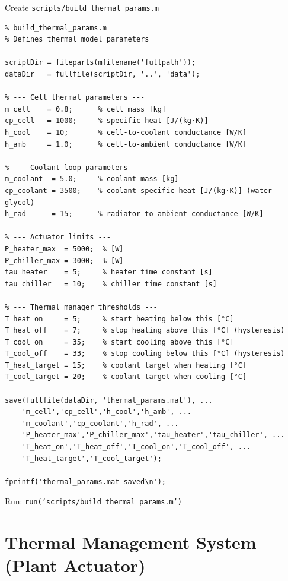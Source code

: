 \documentclass[11pt,a4paper]{article}
\begin{document}
\begin{scriptbox}{Create \texttt{scripts/build\_thermal\_params.m}}
\begin{verbatim}
% build_thermal_params.m
% Defines thermal model parameters

scriptDir = fileparts(mfilename('fullpath'));
dataDir   = fullfile(scriptDir, '..', 'data');

% --- Cell thermal parameters ---
m_cell    = 0.8;      % cell mass [kg]
cp_cell   = 1000;     % specific heat [J/(kg·K)]
h_cool    = 10;       % cell-to-coolant conductance [W/K]
h_amb     = 1.0;      % cell-to-ambient conductance [W/K]

% --- Coolant loop parameters ---
m_coolant  = 5.0;     % coolant mass [kg]
cp_coolant = 3500;    % coolant specific heat [J/(kg·K)] (water-glycol)
h_rad      = 15;      % radiator-to-ambient conductance [W/K]

% --- Actuator limits ---
P_heater_max  = 5000;  % [W]
P_chiller_max = 3000;  % [W]
tau_heater    = 5;     % heater time constant [s]
tau_chiller   = 10;    % chiller time constant [s]

% --- Thermal manager thresholds ---
T_heat_on     = 5;     % start heating below this [°C]
T_heat_off    = 7;     % stop heating above this [°C] (hysteresis)
T_cool_on     = 35;    % start cooling above this [°C]
T_cool_off    = 33;    % stop cooling below this [°C] (hysteresis)
T_heat_target = 15;    % coolant target when heating [°C]
T_cool_target = 20;    % coolant target when cooling [°C]

save(fullfile(dataDir, 'thermal_params.mat'), ...
    'm_cell','cp_cell','h_cool','h_amb', ...
    'm_coolant','cp_coolant','h_rad', ...
    'P_heater_max','P_chiller_max','tau_heater','tau_chiller', ...
    'T_heat_on','T_heat_off','T_cool_on','T_cool_off', ...
    'T_heat_target','T_cool_target');

fprintf('thermal_params.mat saved\n');
\end{verbatim}
Run: \texttt{run('scripts/build\_thermal\_params.m')}
\end{scriptbox}


\newpage
\section{Thermal Management System (Plant Actuator)}
\end{document}
